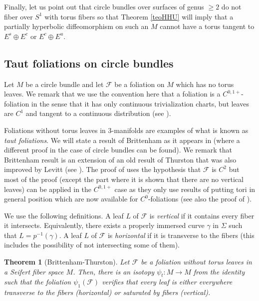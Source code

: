 \documentclass[11pt]{amsart} %
\newcommand{\Es}{E^s}
\newcommand{\Ec}{E^c}
\newcommand{\Eu}{E^u}
\newcommand{\cF}{\mathcal{F}}
\numberwithin{equation}{section}
\newtheorem{teo}[equation]{Theorem}
\theoremstyle{remark}
\begin{document}
Finally, let us point out that circle bundles over surfaces of genus $\geq 2$ do not fiber over $S^1$ with torus fibers so that  Theorem \ref{teoHHU} will imply that a partially hyperbolic diffeomorphism on such an $M$ cannot have a torus tangent to $\Es \oplus \Ec$ or $\Ec \oplus \Eu$. 

%
\subsection{Taut foliations on circle bundles} 

Let $M$ be a circle bundle and let $\cF$ be a foliation on $M$ which has no torus leaves. We remark that we use the convention here that a foliation is a $C^{0,1+}$-foliation in the sense that it has only continuous trivialization charts, but leaves are $C^1$ and tangent to a continuous distribution (see \cite{CandelConlon}). 

Foliations without torus leaves in 3-manifolds are examples of what is known as \emph{taut foliations}. We will state a result of Brittenham \cite{Brittenham} as it appears in \cite[\S4.10]{Calegari} (where a different proof in the case of circle bundles can be found). We remark that Brittenham result is an extension of an old result of Thurston that was also improved by Levitt (see \cite{Levitt-novert}). The proof of \cite{Levitt-novert} uses the hypothesis that $\cF$ is $C^2$ but most of the proof (except the part where it is shown that there are no vertical leaves) can be applied in the $C^{0,1+}$ case as they only use results of putting tori in general position which are now available for $C^0$-foliations \cite{Solodov} (see also the proof of \cite[Proposition 2.3]{Ghys}).  

We use the following definitions.
A leaf $L$ of $\cF$ is \emph{vertical} if it contains every fiber it intersects. Equivalently, there exists a properly immersed curve $\gamma$ in $\Sigma$ such that $L= p^{-1}(\gamma)$. 
A leaf $L$ of $\cF$ is \emph{horizontal} if it is transverse to the fibers (this includes the possibility of not intersecting some of them). 

\begin{teo}[Brittenham-Thurston]\label{teo-brit}
Let $\cF$ be a foliation without torus leaves in a Seifert fiber space $M$. Then, there is an isotopy $\psi_t: M \to M$ from the identity such that the foliation $\psi_1(\cF)$ verifies that every leaf is either everywhere transverse to the fibers (horizontal) or saturated by fibers (vertical).   
\end{teo}
\end{document}
